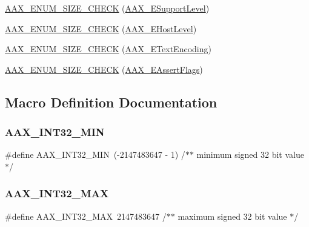 \begin{DoxyCompactItemize}
\item 
\mbox{\hyperlink{a00491_ae131459a5bc5dfae6de6551e96a5eb8d}{A\+A\+X\+\_\+\+E\+N\+U\+M\+\_\+\+S\+I\+Z\+E\+\_\+\+C\+H\+E\+CK}} (\mbox{\hyperlink{a00491_aca7bf42860665d5da66f4ac342e761b3}{A\+A\+X\+\_\+\+E\+Support\+Level}})
\item 
\mbox{\hyperlink{a00491_aea64259ed31d6b2271ded6f4c1325f26}{A\+A\+X\+\_\+\+E\+N\+U\+M\+\_\+\+S\+I\+Z\+E\+\_\+\+C\+H\+E\+CK}} (\mbox{\hyperlink{a00491_a2d34e7a7c2e6f4f6361555ad02869219}{A\+A\+X\+\_\+\+E\+Host\+Level}})
\item 
\mbox{\hyperlink{a00491_a9ca46becb59b9509df91bb70afbab1b7}{A\+A\+X\+\_\+\+E\+N\+U\+M\+\_\+\+S\+I\+Z\+E\+\_\+\+C\+H\+E\+CK}} (\mbox{\hyperlink{a00491_a8152e57310850693e4e7f00fc4922d74}{A\+A\+X\+\_\+\+E\+Text\+Encoding}})
\item 
\mbox{\hyperlink{a00491_af8572aa728e4a62d27090ccb82a14e43}{A\+A\+X\+\_\+\+E\+N\+U\+M\+\_\+\+S\+I\+Z\+E\+\_\+\+C\+H\+E\+CK}} (\mbox{\hyperlink{a00491_ab87a565fcd58c3d860d50a210b264985}{A\+A\+X\+\_\+\+E\+Assert\+Flags}})
\end{DoxyCompactItemize}


\subsection{Macro Definition Documentation}
\mbox{\label{a00491_ae7543e71654aff007dd5e118f550ade4}} 
\subsubsection{\texorpdfstring{AAX\_INT32\_MIN}{AAX\_INT32\_MIN}}
{\footnotesize\ttfamily \#define A\+A\+X\+\_\+\+I\+N\+T32\+\_\+\+M\+IN~(-\/2147483647 -\/ 1) /$\ast$$\ast$ minimum signed 32 bit value $\ast$/}

\mbox{\label{a00491_a3f56ffc36648f848d952971b79e6058e}} 
\subsubsection{\texorpdfstring{AAX\_INT32\_MAX}{AAX\_INT32\_MAX}}
{\footnotesize\ttfamily \#define A\+A\+X\+\_\+\+I\+N\+T32\+\_\+\+M\+AX~2147483647      /$\ast$$\ast$ maximum signed 32 bit value $\ast$/}

